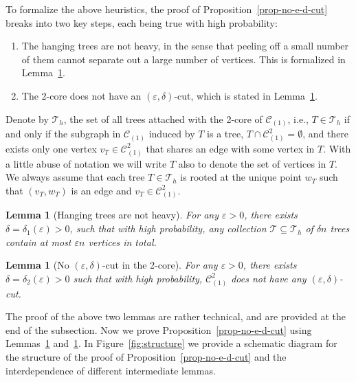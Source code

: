 \documentclass[11pt,a4paper, reqno]{article}
\numberwithin{equation}{section}
\numberwithin{equation}{section}
\def\sss{\scriptscriptstyle}
\newcommand{\1}{\ensuremath{\mathbbm{1}}}
\newtheorem{lemma}[theorem]{Lemma}
\numberwithin{equation}{section}
\numberwithin{theorem}{section}
\begin{document}
To formalize the above heuristics, the proof of Proposition~\ref{prop-no-e-d-cut} breaks into two key steps, each being true with high probability:
 \begin{enumerate}[{\normalfont (i)}]
  \item The hanging trees are not heavy, in the sense that peeling off a small number of them cannot separate out a large number of vertices. This is formalized in Lemma~\ref{lem:thin-tree}.
  \item The 2-core does not have an $(\varepsilon,\delta)$-cut, which is stated in Lemma~\ref{lem-epsilon-delta-2-core}.
 \end{enumerate}
 Denote by $\mathcal{T}_h$, the set of all trees attached with the 2-core of $\mathscr{C}_{(1)}$, i.e., $T\in \mathcal{T}_h$ if and only if the subgraph in $\mathscr{C}_{(1)}$ induced by $T$ is a tree, $T\cap \mathscr{C}_{\sss (1)}^2 =\emptyset $, and there exists only one vertex $v_T\in \mathscr{C}_{\sss (1)}^2$ that shares an edge with some vertex in $T$. 
With a little abuse of notation we will write $T$ also to denote the set of vertices in $T$. 
 We always assume that each tree $T \in \mathcal{T}_h$ is rooted at the unique point $w_T$ such that $(v_T,w_T)$ is an edge and $v_T\in\mathscr{C}_{\sss (1)}^2$.
\begin{lemma}[Hanging trees are not heavy]
\label{lem:thin-tree}
For any $\varepsilon>0$, there exists $\delta=\delta_1(\varepsilon)>0$, such that with high probability, any collection $\mathcal{T}\subseteq\mathcal{T}_h$ of $\delta n$ trees contain at most $\varepsilon n$ vertices in total.
\end{lemma}
\begin{lemma}[No $(\varepsilon,\delta)$-cut in the 2-core]\label{lem-epsilon-delta-2-core}
For any $\varepsilon>0$, there exists $\delta = \delta_2(\varepsilon) > 0$ such that with high probability,
$\mathscr{C}_{\sss (1)}^2 $ does not have any $(\varepsilon, \delta)$-cut.
\end{lemma}
The proof of the above two lemmas are rather technical, and are provided at the end of the subsection. 
Now we prove Proposition~\ref{prop-no-e-d-cut} using Lemmas~\ref{lem:thin-tree} and~\ref{lem-epsilon-delta-2-core}.
In Figure~\ref{fig:structure} we provide a schematic diagram for the structure of the proof of Proposition~\ref{prop-no-e-d-cut} and the interdependence of different intermediate lemmas.
\end{document}

